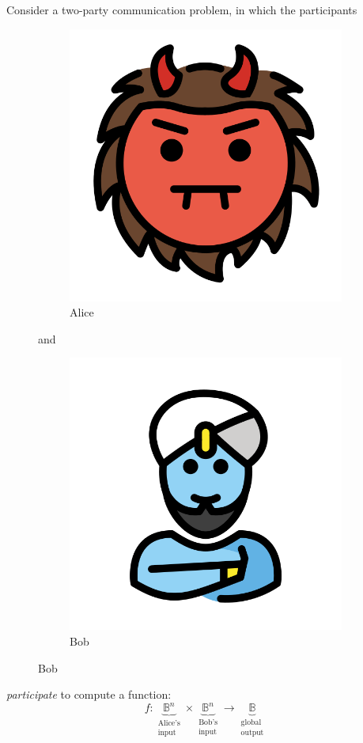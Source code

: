 Consider a two-party communication problem,
	in which the participants

\begin{figure}[h]
\centering
\begin{subfigure}{.3\textwidth}
  \centering
  \includegraphics[width=.2\linewidth]{introduction/alice.png}
  \caption{Alice}
  \label{fig:alice}
\end{subfigure}%
and
\begin{subfigure}{.3\textwidth}
  \centering
  \includegraphics[width=.2\linewidth]{introduction/bob.png}
  \caption{Bob}
  \label{fig:bob}
\end{subfigure}
\label{fig:participants}
\end{figure}

\emph{participate} to compute a function:
\[f : \underbrace{\mathbb{B}^n}_{\begin{aligned}\text{Alice's}\\\text{input}\end{aligned}} \times 
      \underbrace{\mathbb{B}^n}_{\begin{aligned}\text{Bob's}\\\text{input}\end{aligned}} \to 
      \underbrace{\mathbb{B}}_{\begin{aligned}\text{global}\\\text{output}\end{aligned}}\]